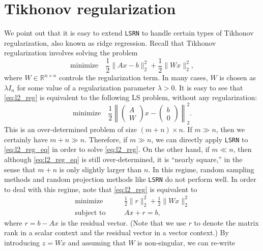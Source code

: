 \documentclass{siamltex}
\begin{document}
\section{Tikhonov regularization}
\label{sec:regularization}

We point out that it is easy to extend \texttt{LSRN} to handle certain types of
Tikhonov regularization, also known as ridge regression.  Recall that Tikhonov
regularization involves solving the problem
\begin{equation}
  \label{eq:l2_reg}
  \text{minimize} \quad \frac{1}{2} \| A x - b \|_2^2 + \frac{1}{2} \| W x \|_2^2,
\end{equation}
where $W \in \mathbb{R}^{n \times n}$ controls the regularization term.  In many
cases, $W$ is chosen as $\lambda I_n$ for some value of a regularization
parameter $\lambda > 0$.  It is easy to see that \eqref{eq:l2_reg} is equivalent
to the following LS problem, without any regularization:
\begin{equation}
  \label{eq:l2_reg_eq}
  \text{minimize} \quad \frac{1}{2} \left\|
    \begin{pmatrix}
      A \\ W 
    \end{pmatrix}
    x - 
    \begin{pmatrix}
      b \\ 0
    \end{pmatrix} \right\|_2^2.
\end{equation}
This is an over-determined problem of size $(m+n) \times n$.  If $m \gg n$, then
we certainly have $m+n \gg n$.  Therefore, if $m \gg n$, we can directly apply
\texttt{LSRN} to \eqref{eq:l2_reg_eq} in order to solve \eqref{eq:l2_reg}.  On
the other hand, if $m \ll n$, then although \eqref{eq:l2_reg_eq} is still
over-determined, it is ``nearly square,'' in the sense that $m+n$ is only
slightly larger than $n$.  In this regime, random sampling methods and random
projection methods like \texttt{LSRN} do not perform well. In order to deal with
this regime, note that \eqref{eq:l2_reg} is equivalent to
\begin{eqnarray*}
  \text{minimize} &\quad& \frac{1}{2} \| r \|_2^2 + \frac{1}{2} \| W x \|_2^2 \\
  \text{subject to} &\quad& A x + r = b,
\end{eqnarray*}
where $r = b - A x$ is the residual vector.  (Note that we use $r$ to denote the
matrix rank in a scalar context and the residual vector in a vector context.)
By introducing $z = W x$ and assuming that $W$ is non-singular, we can re-write
\end{document}
